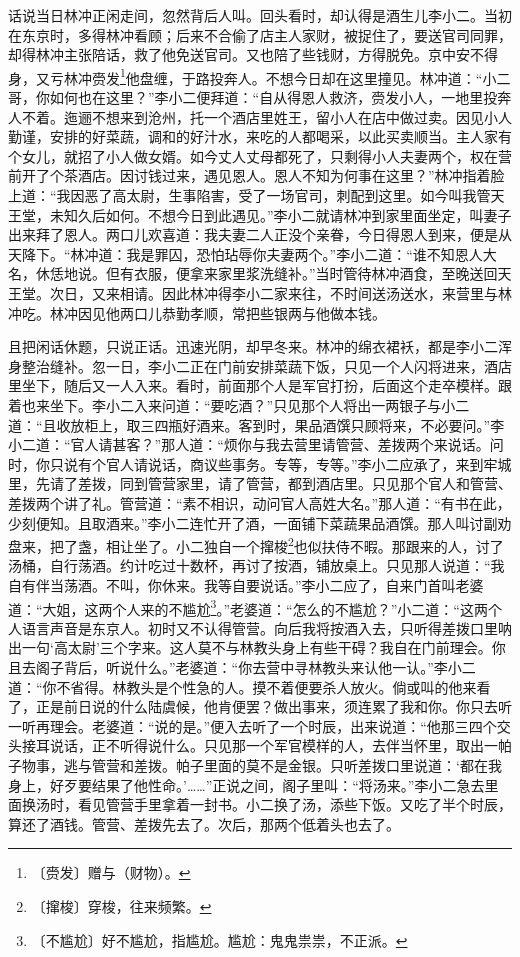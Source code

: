 \documentclass[12pt,UTF-8,openany]{ctexbook}
\begin{document}
\begin{large}
    
    话说当日林冲正闲走间，忽然背后人叫。回头看时，却认得是酒生儿李小二。当初在东京时，多得林冲看顾；后来不合偷了店主人家财，被捉住了，要送官司同罪，却得林冲主张陪话，救了他免送官司。又也陪了些钱财，方得脱免。京中安不得身，又亏林冲赍发\footnote{〔赍发〕赠与（财物）。}他盘缠，于路投奔人。不想今日却在这里撞见。林冲道：“小二哥，你如何也在这里？”李小二便拜道：“自从得恩人救济，赍发小人，一地里投奔人不着。迤逦不想来到沧州，托一个酒店里姓王，留小人在店中做过卖。因见小人勤谨，安排的好菜蔬，调和的好汁水，来吃的人都喝采，以此买卖顺当。主人家有个女儿，就招了小人做女婿。如今丈人丈母都死了，只剩得小人夫妻两个，权在营前开了个茶酒店。因讨钱过来，遇见恩人。恩人不知为何事在这里？”林冲指着脸上道：“我因恶了高太尉，生事陷害，受了一场官司，刺配到这里。如今叫我管天王堂，未知久后如何。不想今日到此遇见。”李小二就请林冲到家里面坐定，叫妻子出来拜了恩人。两口儿欢喜道：我夫妻二人正没个亲眷，今日得恩人到来，便是从天降下。“林冲道：我是罪囚，恐怕玷辱你夫妻两个。”李小二道：“谁不知恩人大名，休恁地说。但有衣服，便拿来家里浆洗缝补。”当时管待林冲酒食，至晚送回天王堂。次日，又来相请。因此林冲得李小二家来往，不时间送汤送水，来营里与林冲吃。林冲因见他两口儿恭勤孝顺，常把些银两与他做本钱。
    
    且把闲话休题，只说正话。迅速光阴，却早冬来。林冲的绵衣裙袄，都是李小二浑身整治缝补。忽一日，李小二正在门前安排菜蔬下饭，只见一个人闪将进来，酒店里坐下，随后又一人入来。看时，前面那个人是军官打扮，后面这个走卒模样。跟着也来坐下。李小二入来问道：“要吃酒？”只见那个人将出一两银子与小二道：“且收放柜上，取三四瓶好酒来。客到时，果品酒馔只顾将来，不必要问。”李小二道：“官人请甚客？”那人道：“烦你与我去营里请管营、差拨两个来说话。问时，你只说有个官人请说话，商议些事务。专等，专等。”李小二应承了，来到牢城里，先请了差拨，同到管营家里，请了管营，都到酒店里。只见那个官人和管营、差拨两个讲了礼。管营道：“素不相识，动问官人高姓大名。”那人道：“有书在此，少刻便知。且取酒来。”李小二连忙开了酒，一面铺下菜蔬果品酒馔。那人叫讨副劝盘来，把了盏，相让坐了。小二独自一个撺梭\footnote{〔撺梭〕穿梭，往来频繁。}也似扶侍不暇。那跟来的人，讨了汤桶，自行荡酒。约计吃过十数杯，再讨了按酒，铺放桌上。只见那人说道：“我自有伴当荡酒。不叫，你休来。我等自要说话。”李小二应了，自来门首叫老婆道：“大姐，这两个人来的不尴尬\footnote{〔不尴尬〕好不尴尬，指尴尬。尴尬：鬼鬼祟祟，不正派。}。”老婆道：“怎么的不尴尬？”小二道：“这两个人语言声音是东京人。初时又不认得管营。向后我将按酒入去，只听得差拨口里呐出一句‘高太尉’三个字来。这人莫不与林教头身上有些干碍？我自在门前理会。你且去阁子背后，听说什么。”老婆道：“你去营中寻林教头来认他一认。”李小二道：“你不省得。林教头是个性急的人。摸不着便要杀人放火。倘或叫的他来看了，正是前日说的什么陆虞候，他肯便罢？做出事来，须连累了我和你。你只去听一听再理会。老婆道：“说的是。”便入去听了一个时辰，出来说道：“他那三四个交头接耳说话，正不听得说什么。只见那一个军官模样的人，去伴当怀里，取出一帕子物事，逃与管营和差拨。帕子里面的莫不是金银。只听差拨口里说道：‘都在我身上，好歹要结果了他性命。’……”正说之间，阁子里叫：“将汤来。”李小二急去里面换汤时，看见管营手里拿着一封书。小二换了汤，添些下饭。又吃了半个时辰，算还了酒钱。管营、差拨先去了。次后，那两个低着头也去了。
    

\end{large}
\end{document}
